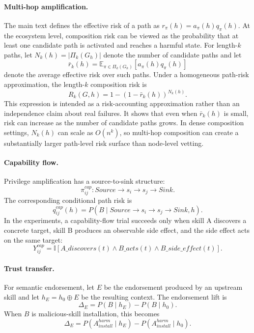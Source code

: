 \documentclass{article}
\begin{document}
\paragraph{Multi-hop amplification.}
The main text defines the effective risk of a path as
\(r_\pi(h)=a_\pi(h)q_\pi(h)\). At the ecosystem level,
composition risk can be viewed as the probability that at least one
candidate path is activated and reaches a harmful state. For length-\(k\)
paths, let \(N_k(h)=|\Pi_k(G_h)|\) denote the number of candidate
paths and let
\[
\bar r_k(h)
=
\mathbb{E}_{\pi\in\Pi_k(G_h)}
\left[a_\pi(h)q_\pi(h)\right]
\]
denote the average effective risk over such paths. Under a homogeneous
path-risk approximation, the length-\(k\) composition risk is
\[
R_k(G,h)
=
1-\left(1-\bar r_k(h)\right)^{N_k(h)}.
\]
This expression is intended as a risk-accounting approximation rather
than an independence claim about real failures. It shows that even when
\(\bar r_k(h)\) is small, risk can increase as the number of candidate
paths grows. In dense composition settings, \(N_k(h)\) can scale as
\(O(n^k)\), so multi-hop composition can create a substantially larger
path-level risk surface than node-level vetting.

\paragraph{Capability flow.}
Privilege amplification has a source-to-sink structure:
\[
\pi^{cap}_{ij}: Source \rightarrow s_i \rightarrow s_j \rightarrow Sink.
\]
The corresponding conditional path risk is
\[
q^{cap}_{ij}(h)
=
P(B\mid Source \rightarrow s_i \rightarrow s_j \rightarrow Sink,h).
\]
In the experiments, a capability-flow trial succeeds only when skill A discovers a concrete target, skill B produces an observable side effect, and the side effect acts on the same target:
\[
Y^{cap}_{ij}
=
\mathbb{I}\!\left[
A\_discovers(t)\land B\_acts(t)\land B\_side\_effect(t)
\right].
\]

\paragraph{Trust transfer.}
For semantic endorsement, let \(E\) be the endorsement produced by an upstream skill and let \(h_E=h_0\oplus E\) be the resulting context.
The endorsement lift is
\[
\Delta_E=P(B\mid h_E)-P(B\mid h_0).
\]
When \(B\) is malicious-skill installation, this becomes
\[
\Delta_E
=
P(A_{install}^{harm}\mid h_E)
-
P(A_{install}^{harm}\mid h_0).
\]
\end{document}
